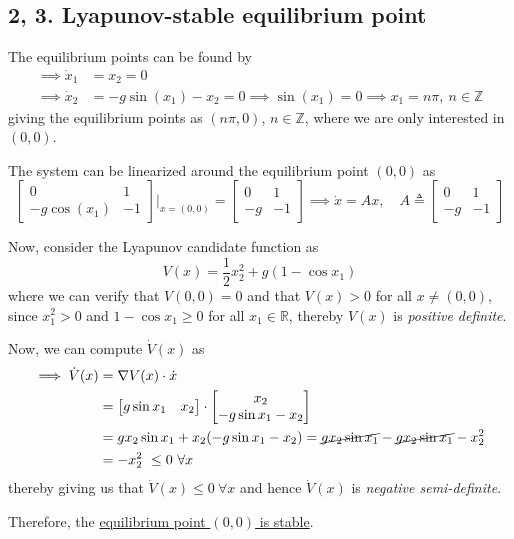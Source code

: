 \subsection*{2, 3. Lyapunov-stable equilibrium point}

The equilibrium points can be found by
\begin{align*}
    \implies
    \dot{x}_{1}
     & =
    x_{2} = 0
    \\
    \implies
    \dot{x}_{2}
     & =
    -g \sin (x_{1}) - x_{2} = 0
    \implies
    \sin (x_{1}) = 0
    \implies
    x_{1} = n \pi, \ n \in \mathbb{Z}
\end{align*}
giving the equilibrium points as \( (n \pi, 0) \), \( n \in \mathbb{Z} \), where we are only interested in \( (0, 0) \).

The system can be linearized around the equilibrium point \( (0, 0) \) as
\[
    \begin{bmatrix}
        0             & 1  \\
        -g \cos (x_1) & -1
    \end{bmatrix} \Bigg|_{x = (0, 0)}
    =
    \begin{bmatrix}
        0  & 1  \\
        -g & -1
    \end{bmatrix}
    \implies
    \dot x = Ax, \quad
    A \triangleq \begin{bmatrix} 0 & 1 \\ -g & -1 \end{bmatrix}
\]

Now, consider the Lyapunov candidate function as
\[
    V(x) = \frac{1}{2} x_2^2 + g (1 - \cos x_1)
\]
where we can verify that \( V(0, 0) = 0 \) and that \( V(x) > 0 \) for all \( x \neq (0, 0) \), since \( x_1^2 > 0 \) and \( 1 - \cos x_1 \geq 0 \) for all \( x_1 \in \mathbb{R} \), thereby \( V(x) \) is \emph{positive definite}.

Now, we can compute \( \dot V(x) \) as
\begin{align*}
    \implies
    \dot V(x)
     & =
    \nabla V(x) \cdot \dot x
    \\ & =
    \begin{bmatrix} g \sin x_1 & x_2 \end{bmatrix} \cdot \begin{bmatrix} x_2 \\ -g \sin x_1 - x_2 \end{bmatrix}
    \\ & =
    g x_2 \sin x_1 + x_2 (-g \sin x_1 - x_2)
    =
    \cancel{g x_2 \sin x_1} - \cancel{g x_2 \sin x_1} - x_2^2
    \\ & =
    -x_2^2 \ \leq 0 \ \forall x
\end{align*}
thereby giving us that \( \dot V(x) \leq 0 \ \forall x \) and hence \( \dot V(x) \) is \emph{negative semi-definite}.

Therefore, the \underline{equilibrium point \( (0, 0) \) is stable}.
